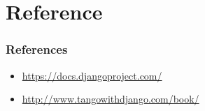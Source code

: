 \documentclass[bigger, presentation]{beamer}
\begin{document}
\section{Reference}
\label{sec-5}
\begin{frame}
\frametitle{References}
\label{sec-5-1}

\begin{itemize}
\item \href{https://docs.djangoproject.com/}{https://docs.djangoproject.com/}
\item \href{http://www.tangowithdjango.com/book/}{http://www.tangowithdjango.com/book/}
\end{itemize}
\end{frame}
\end{document}
